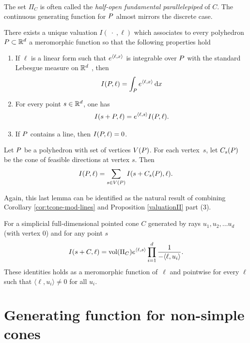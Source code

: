 The set $\Pi_C$ is often called the \emph{half-open fundamental parallelepiped} of $C$. The continuous generating function for ${ P}$ almost mirrors the discrete case. 

\begin{proposition}\label{valuationII}
There exists a unique valuation  $I(\;\cdot\;, \ell)$ which  associates  to every polyhedron
${ P}\subset {\mathbb R}^d$ a meromorphic function so that the following properties hold 

\begin{enumerate}
\item If $\ell$ is a linear form such that $e^{{\langle} \ell, x {\rangle}}$ is integrable over ${ P}$ with the standard Lebesgue measure on ${\mathbb R}^d$ , then 
\[ I({ P},\ell) = \int_{ P} e^{{\langle} \ell, x {\rangle}} \,\mathrm{d} x\]
\item For every point $s \in {\mathbb R}^d$, one has
\[I(s+{ P}, \ell) = e^{{\langle} \ell, s {\rangle}}I({ P},\ell).\]
\item If ${ P}$ contains a line, then $I({ P}, \ell) = 0$.
\end{enumerate}
\end{proposition}


\begin{lemma}  Let ${ P}$ be a polyhedron with set of vertices $V({ P})$. For each
vertex~$s$, let $C_s({ P})$ be the cone of feasible directions at vertex $s$. Then
\begin{equation*}
I({ P},\ell)=\sum_{s\in V({ P})}I(s+C_s({ P}),\ell).
\end{equation*}
\end{lemma}

Again, this last lemma can be identified as the natural result of combining Corollary \ref{cor:tcone-mod-lines} and Proposition \ref{valuationII} part (3).

\begin{proposition} 
  \label{prop:integral-exp-simplicial}
  For a simplicial full-dimensional pointed cone $C$ generated by rays $u_1,u_2,\dots u_d$ (with vertex $0$) and for any point $s$
\begin{equation*}
I(s+C,\ell) = \text{vol} (\Pi_C)e^{{\langle} \ell, s {\rangle}} \prod_{i=1}^d \frac{1}{-{\langle} \ell, u_i {\rangle}}.
\end{equation*}
These identities holds as a meromorphic function of~$\ell$ 
and pointwise for every $\ell$ such that $\langle \ell, u_i \rangle \neq 0$ for
all $u_i$.
\end{proposition}

\section{Generating function for non-simple cones}

